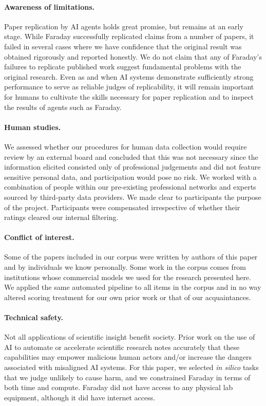 \documentclass[garamond,a4paper]{inherent}
\begin{document}
\paragraph{Awareness of limitations.}
Paper replication by AI agents holds great promise, but remains at an early stage. While Faraday successfully replicated claims from a number of papers, it failed in several cases where we have confidence that the original result was obtained rigorously and reported honestly. We do not claim that any of Faraday's failures to replicate published work suggest fundamental problems with the original research. Even as and when AI systems demonstrate sufficiently strong performance to serve as reliable judges of replicability, it will remain important for humans to cultivate the skills necessary for paper replication and to inspect the results of agents such as Faraday.

\paragraph{Human studies.}
We assessed whether our procedures for human data collection would require review by an external board and concluded that this was not necessary since the information elicited consisted only of professional judgements and did not feature sensitive personal data, and participation would pose no risk. We worked with a combination of people within our pre-existing professional networks and experts sourced by third-party data providers. We made clear to participants the purpose of the project. Participants were compensated irrespective of whether their ratings cleared our internal filtering. 

\paragraph{Conflict of interest.}
Some of the papers included in our corpus were written by authors of this paper and by individuals we know personally. Some work in the corpus comes from institutions whose commercial models we used for the research presented here. We applied the same automated pipeline to all items in the corpus and in no way altered scoring treatment for our own prior work or that of our acquaintances.

\paragraph{Technical safety.}
Not all applications of scientific insight benefit society. Prior work on the use of AI to automate or accelerate scientific research notes accurately that these capabilities may empower malicious human actors and/or increase the dangers associated with misaligned AI systems. For this paper, we selected \textit{in silico} tasks that we judge unlikely to cause harm, and we constrained Faraday in terms of both time and compute. Faraday did not have access to any physical lab equipment, although it did have internet access. 
\end{document}
